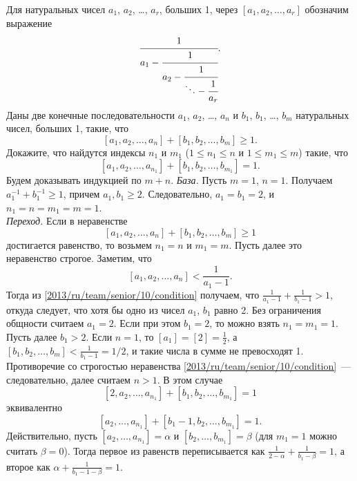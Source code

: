 \problem{}
Для натуральных чисел $a_1$, $a_2$, \ldots, $a_r$, больших 1, через
$[a_1, a_2, \ldots, a_r]$ обозначим выражение
\[
    \cfrac{1}{
        a_1 - \cfrac{1}{
            a_2 - \cfrac{1}{
                \ddots - \cfrac{1}{a_r} } } }
.\]
Даны две конечные последовательности
$a_1$, $a_2$, \ldots, $a_n$ и $b_1$, $b_1$, \ldots, $b_m$
натуральных чисел, больших 1, такие, что
\[
    [a_1, a_2, \ldots, a_n] + [b_1, b_2, \ldots, b_m] \geq 1
.\]
Докажите, что найдутся индексы $n_1$ и $m_1$
($1 \leq n_1 \leq n$ и $1 \leq m_1 \leq m$)
такие, что
\[
    [a_1, a_2, \ldots, a_{n_1}] + [b_1, b_2, \ldots, b_{m_1}] = 1
.\]
\solution
Будем доказывать индукцией по $m + n$.
\emph{База.}
Пусть $m = 1$, $n = 1$.
Получаем $a_1^{-1} + b_1^{-1} \geq 1$, причем $a_1, b_1 \geq 2$.
Следовательно, $a_1 = b_1 = 2$, и $n_1 = n = m_1 = m = 1$.
\\
\emph{Переход.}
Если в неравенстве
\begin{equation}\label{2013/ru/team/senior/10/condition}
    [a_1, a_2, \ldots, a_n] + [b_1, b_2, \ldots, b_m] \geq 1
\end{equation}
достигается равенство, то возьмем $n_1 = n$ и $m_1 = m$.
Пусть далее это неравенство строгое.
Заметим, что
\[
    [a_1, a_2, \ldots, a_n] < \frac{1}{a_1 - 1}
.\]
Тогда из \eqref{2013/ru/team/senior/10/condition} получаем, что
$\frac{1}{a_1 - 1} + \frac{1}{b_1 - 1} > 1$, откуда следует, что хотя бы одно
из чисел $a_1$, $b_1$ равно 2.
Без ограничения общности считаем $a_1 = 2$.
Если при этом $b_1 = 2$, то можно взять $n_1 = m_1 = 1$.
Пусть далее $b_1 > 2$.
Если $n = 1$, то $[a_1] = [2] = \frac{1}{2}$,
а $[b_1, b_2, \ldots, b_m] < \frac{1}{b_1 - 1} = 1/2$,
и такие числа в сумме не превосходят 1.
Противоречие со строгостью неравенства
\eqref{2013/ru/team/senior/10/condition}~--- следовательно, далее считаем
$n > 1$.
В этом случае
\begin{equation}\label{2013/ru/team/senior/10/current-statement}
    [2, a_2, \ldots, a_{n_1}] + [b_1, b_2, \ldots, b_{m_1}] = 1
\end{equation}
эквивалентно
\begin{equation}\label{2013/ru/team/senior/10/previous-statement}
    [a_2, \ldots, a_{n_1}] + [b_1 - 1, b_2, \ldots, b_{m_1}] = 1
.\end{equation}
Действительно, пусть $[a_2, \ldots, a_{n_1}] = \alpha$ и
$[b_2, \ldots, b_{m_1}] = \beta$ (для $m_1 = 1$ можно считать $\beta = 0$).
Тогда первое из равенств переписывается как
$\frac{1}{2 - \alpha} + \frac{1}{b_1 - \beta} = 1$,
а второе как $\alpha + \frac{1}{b_1 - 1 - \beta} = 1$.

